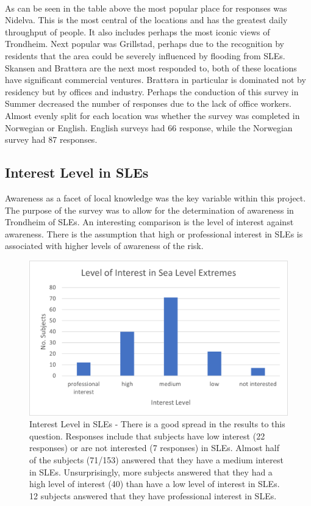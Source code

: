 \paragraph{}

As can be seen in the table above the most popular place for responses was Nidelva. This is the most central of the locations and has the greatest daily throughput of people. It also includes perhaps the most iconic views of Trondheim. Next popular was Grillstad, perhaps due to the recognition by residents that the area could be severely influenced by flooding from SLEs. Skansen and Brattøra are the next most responded to, both of these locations have significant commercial ventures. Brattøra in particular is dominated not by residency but by offices and industry. Perhaps the conduction of this survey in Summer decreased the number of responses due to the lack of office workers. Almost evenly split for each location was whether the survey was completed in Norwegian or English. English surveys had 66 response, while the Norwegian survey had 87 responses.  

\subsection{Interest Level in SLEs}
Awareness as a facet of local knowledge was the key variable within this project. The purpose of the survey was to allow for the determination of awareness in Trondheim of SLEs. An interesting comparison is the level of interest against awareness. There is the assumption that high or professional interest in SLEs is associated with higher levels of awareness of the risk. 
\begin{figure}[H]
    \centering
    \includegraphics{fig_results/interest-level.png}
    \caption{Interest Level in SLEs - There is a good spread in the results to this question. Responses include that subjects have low interest (22 responses) or are not interested (7 responses) in SLEs. Almost half of the subjects (71/153) answered that they have a medium interest in SLEs. Unsurprisingly, more subjects answered that they had a high level of interest (40) than have a low level of interest in SLEs. 12 subjects answered that they have professional interest in SLEs. }
    \label{fig:my_interest_level}
\end{figure}
